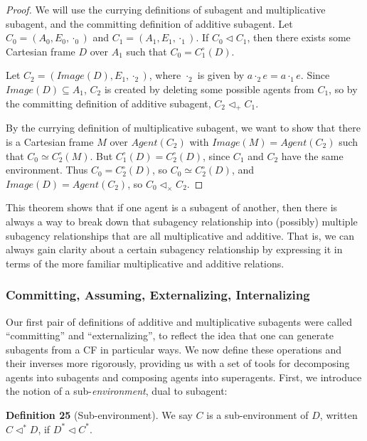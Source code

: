 \documentclass{article}
\begin{document}
\begin{proof}
We will use the currying definitions of subagent and multiplicative subagent, and the committing definition of additive subagent.
Let $C_0 = (A_0, E_0, \cdot_0)$ and $C_1 = (A_1, E_1, \cdot_1)$.
If $C_0 \triangleleft C_1$, then there exists some Cartesian frame $D$ over $A_1$ such that $C_0 = C^{\circ}_1 (D)$. 

Let $C_2 = (Image(D), E_1, \cdot_2)$, where $\cdot_2$ is given by $a \cdot_2 e = a \cdot_1 e$.
Since $Image(D) \subseteq A_1$, $C_2$ is created by deleting some possible agents from $C_1$, so by the committing definition of additive subagent, $C_2 \triangleleft_+ C_1$.

By the currying definition of multiplicative subagent, we want to show that there is a Cartesian frame $M$  over $Agent(C_2)$ with $Image(M) = Agent(C_2)$ such that $C_0 \simeq C^{\circ}_2 (M)$.
But $C^{\circ}_1 (D) = C^{\circ}_2 (D)$, since $C_1$ and $C_2$ have the same environment.
Thus $C_0 = C^{\circ}_2 (D)$, so $C_0 \simeq C^{\circ}_2 (D)$, and $Image(D) = Agent(C_2)$, so $C_0 \triangleleft_{\times} C_2$.
\end{proof}

This theorem shows that if one agent is a subagent of another, then there is always a way to break down that subagency relationship into (possibly) multiple subagency relationships that are all multiplicative and additive. That is, we can always gain clarity about a certain subagency relationship by expressing it in terms of the more familiar multiplicative and additive relations. 

\subsubsection{Committing, Assuming, Externalizing, Internalizing}
\label{comm}

Our first pair of definitions of additive and multiplicative subagents were called ``committing'' and ``externalizing'', to reflect the idea that one can generate subagents from a CF in particular ways.
We now define these operations and their inverses more rigorously, providing us with a set of tools for decomposing agents into subagents and composing agents into superagents.
First, we introduce the notion of a sub-\emph{environment}, dual to subagent:

\bigskip
\noindent \textbf{Definition 25} (Sub-environment).
We say $C$ is a sub-environment of $D$, written $C \triangleleft^* D$, if $D^* \triangleleft C^*$.
\end{document}

